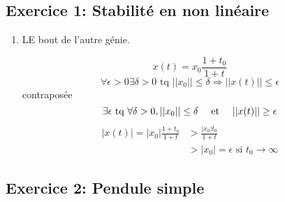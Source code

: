 \documentclass{../../td}
\begin{document}
\subsection*{Exercice 1: Stabilité en non linéaire}
\begin{enumerate}
\item

LE bout de l'autre génie.


\[x(t) = x_0 \frac{1+t_0}{1+t}\]
\[\forall  \epsilon > 0 \exists \delta > 0 \text{ tq } ||x_0|| \leq \delta \Rightarrow ||x(t) || \leq \epsilon\]
contraposée
\[\exists \epsilon \text{ tq } \forall \delta >0, ||x_0|| \leq \delta \quad\text{ et }\quad ||x(t) || \geq \epsilon\]
\begin{align*}
|x(t)| = |x_0| \frac{1+t_0}{1+t} &> \frac{|x_0|t_0}{1+t}\\
& > |x_0| = \epsilon \text{ si } t_0 \rightarrow \infty
\end{align*}

\end{enumerate}


\subsection*{Exercice 2: Pendule simple}
\end{document}
